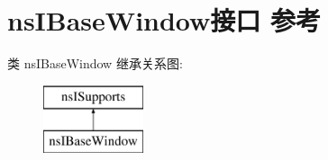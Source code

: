 \hypertarget{interfacens_i_base_window}{}\section{ns\+I\+Base\+Window接口 参考}
\label{interfacens_i_base_window}
类 ns\+I\+Base\+Window 继承关系图\+:\begin{figure}[H]
\begin{center}
\leavevmode
\includegraphics[height=2.000000cm]{interfacens_i_base_window}
\end{center}
\end{figure}
